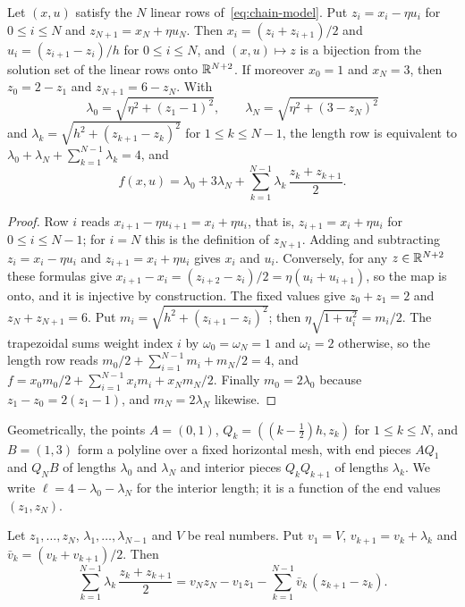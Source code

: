 \begin{lemma}\label{lem:chain-polyline}
Let $(x,u)$ satisfy the $N$ linear rows of~\eqref{eq:chain-model}.
Put $z_i = x_i - \eta u_i$ for $0 \le i \le N$ and $z_{N+1} = x_N + \eta u_N$.
Then $x_i = (z_i + z_{i+1})/2$ and $u_i = (z_{i+1} - z_i)/h$ for $0 \le i \le N$, and $(x,u) \mapsto z$ is a bijection from the solution set of the linear rows onto $\mathbb{R}^{N+2}$.
If moreover $x_0 = 1$ and $x_N = 3$, then $z_0 = 2 - z_1$ and $z_{N+1} = 6 - z_N$.
With
\[
\lambda_0 = \sqrt{\eta^2 + (z_1 - 1)^2},\qquad \lambda_N = \sqrt{\eta^2 + (3 - z_N)^2}
\]
and $\lambda_k = \sqrt{h^2 + (z_{k+1} - z_k)^2}$ for $1 \le k \le N-1$, the length row is equivalent to $\lambda_0 + \lambda_N + \sum_{k=1}^{N-1}\lambda_k = 4$, and
\begin{equation}\label{eq:chain-pieces}
f(x,u) = \lambda_0 + 3\lambda_N + \sum_{k=1}^{N-1} \lambda_k\, \frac{z_k + z_{k+1}}{2}.
\end{equation}
\end{lemma}

\begin{proof}
Row $i$ reads $x_{i+1} - \eta u_{i+1} = x_i + \eta u_i$, that is, $z_{i+1} = x_i + \eta u_i$ for $0 \le i \le N-1$; for $i = N$ this is the definition of $z_{N+1}$.
Adding and subtracting $z_i = x_i - \eta u_i$ and $z_{i+1} = x_i + \eta u_i$ gives $x_i$ and $u_i$.
Conversely, for any $z \in \mathbb{R}^{N+2}$ these formulas give $x_{i+1} - x_i = (z_{i+2} - z_i)/2 = \eta(u_i + u_{i+1})$, so the map is onto, and it is injective by construction.
The fixed values give $z_0 + z_1 = 2$ and $z_N + z_{N+1} = 6$.
Put $m_i = \sqrt{h^2 + (z_{i+1} - z_i)^2}$; then $\eta\sqrt{1+u_i^2} = m_i/2$.
The trapezoidal sums weight index $i$ by $\omega_0 = \omega_N = 1$ and $\omega_i = 2$ otherwise, so the length row reads $m_0/2 + \sum_{i=1}^{N-1}m_i + m_N/2 = 4$, and $f = x_0m_0/2 + \sum_{i=1}^{N-1} x_im_i + x_Nm_N/2$.
Finally $m_0 = 2\lambda_0$ because $z_1 - z_0 = 2(z_1 - 1)$, and $m_N = 2\lambda_N$ likewise.
\end{proof}

Geometrically, the points $A = (0,1)$, $Q_k = ((k - \tfrac12)h, z_k)$ for $1 \le k \le N$, and $B = (1,3)$ form a polyline over a fixed horizontal mesh, with end pieces $AQ_1$ and $Q_NB$ of lengths $\lambda_0$ and $\lambda_N$ and interior pieces $Q_kQ_{k+1}$ of lengths $\lambda_k$.
We write $\ell = 4 - \lambda_0 - \lambda_N$ for the interior length; it is a function of the end values $(z_1, z_N)$.

\begin{lemma}\label{lem:chain-summation}
Let $z_1,\dots,z_N$, $\lambda_1,\dots,\lambda_{N-1}$ and $V$ be real numbers.
Put $v_1 = V$, $v_{k+1} = v_k + \lambda_k$ and $\bar v_k = (v_k + v_{k+1})/2$.
Then
\[
\sum_{k=1}^{N-1} \lambda_k\,\frac{z_k + z_{k+1}}{2} = v_N z_N - v_1 z_1 - \sum_{k=1}^{N-1} \bar v_k\,(z_{k+1} - z_k).
\]
\end{lemma}

